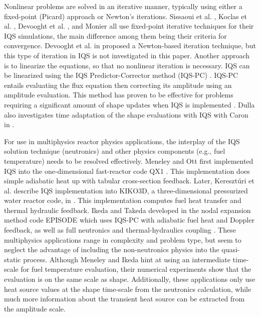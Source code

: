 \documentclass{elsarticle}
\newcommand{\iqspc}{IQS-PC\xspace}
\begin{document}
Nonlinear problems are solved in an iterative manner, typically using either a fixed-point (Picard) approach or Newton's iterations. Sissaoui et al. \cite{Sissaoui_1995}, Koclas et al. \cite{Koclas_1996}, Devooght et al. \cite{Devooght_1984}, and Monier \cite{Monier_diss} all use fixed-point iterative techniques for their IQS simulations, the main difference among them being their criteria for convergence.  Devooght et al. in \cite{Devooght_1984} proposed a Newton-based iteration technique, but this type of iteration in IQS is not investigated in this paper. Another approach is to linearize the equations, so that no nonlinear iteration is necessary. IQS can be linearized using the IQS Predictor-Corrector method (\iqspc) \cite{dulla2006}. \iqspc entails evaluating the flux equation then correcting its amplitude using an amplitude evaluation. This method has proven to be effective for problems requiring a significant amount of shape updates when IQS is implemented \cite{Dulla2008}. Dulla also investigates time adaptation of the shape evaluations with IQS with Caron in \cite{caron2017}.

For use in multiphysics reactor physics applications, the interplay of the IQS solution technique (neutronics) and other physics components (e.g., fuel temperature) needs to be resolved effectively. Meneley and Ott first implemented IQS into the one-dimensional fast-reactor code QX1 \cite{Meneley_1971}. This implementation does simple adiabatic heat up with tabular cross-section feedback. Later, Kereszt\'{u}ri et al. describe IQS implementation into KIKO3D, a three-dimensional pressurized water reactor code, in \cite{KIKO3D_2003}. This implementation computes fuel heat transfer and thermal hydraulic feedback. Ikeda and Takeda developed in the nodal expansion method code EPISODE which uses \iqspc with adiabatic fuel heat and Doppler feedback, as well as full neutronics and thermal-hydraulics coupling \cite{Ikeda_2001}. These multiphysics applications range in complexity and problem type, but seem to neglect the advantage of including the non-neutronics physics into the quasi-static process. Although Meneley and Ikeda hint at using an intermediate time-scale for fuel temperature evaluation, their numerical experiments show that the evaluation is on the same scale as shape. Additionally, these applications only use heat source values at the shape time-scale from the neutronics calculation, while much more information about the transient heat source can be extracted from the amplitude scale.
\end{document}
